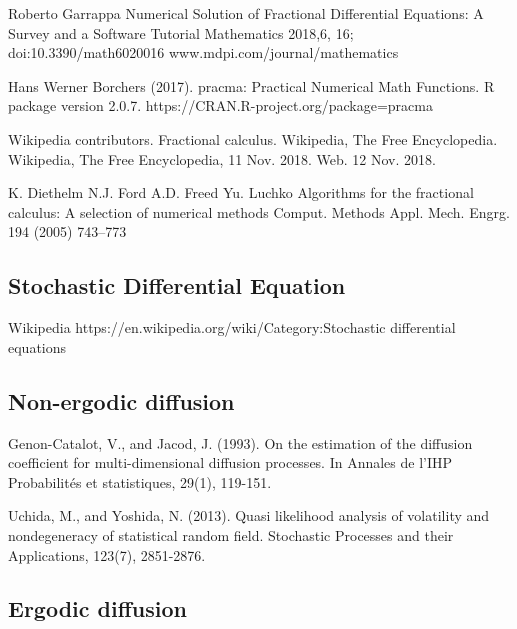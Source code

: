 \begin{thebibliography}{00}
 Roberto Garrappa
\newblock Numerical Solution of Fractional Differential Equations: A Survey and a Software Tutorial
\newblock Mathematics 2018,6, 16; doi:10.3390/math6020016 www.mdpi.com/journal/mathematics

Hans Werner Borchers (2017). 
\newblock pracma: Practical Numerical Math Functions. 
\newblock R package version 2.0.7. https://CRAN.R-project.org/package=pracma

 Wikipedia contributors. 
\newblock Fractional calculus.
\newblock Wikipedia, The Free Encyclopedia. Wikipedia, The Free Encyclopedia, 11 Nov. 2018. Web. 12 Nov. 2018. 

K. Diethelm N.J. Ford A.D. Freed Yu. Luchko
\newblock Algorithms for the fractional calculus: A selection of numerical methods
\newblock Comput. Methods Appl. Mech. Engrg. 194 (2005) 743–773


\subsection{Stochastic Differential Equation}

 Wikipedia
\newblock https://en.wikipedia.org/wiki/Category:Stochastic differential equations

\subsection{Non-ergodic diffusion}

Genon-Catalot, V., and Jacod, J. (1993). 
\newblock On the estimation of the diffusion coefficient for multi-dimensional diffusion processes. 
\newblock In Annales de l'IHP Probabilités et statistiques, 29(1), 119-151.

Uchida, M., and Yoshida, N. (2013). 
\newblock Quasi likelihood analysis of volatility and nondegeneracy of statistical random field. 
\newblock Stochastic Processes and their Applications, 123(7), 2851-2876.

\subsection{Ergodic diffusion}


\end{thebibliography}
